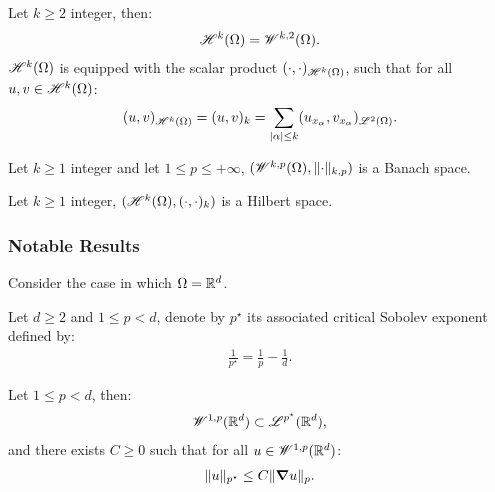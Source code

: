 \begin{definition}
    Let $k \geq 2$ integer, then:
    \begin{gather}
        \mathscr{H}^{k}(\Omega) = \mathscr{W}^{k, 2}(\Omega).
    \end{gather}
    $\mathscr{H}^{k}(\Omega)$ is equipped with the scalar product $(\cdot, \cdot)_{\mathscr{H}^{k}(\Omega)}$, such that for all $u, v \in \mathscr{H}^{k}(\Omega)$:
    \begin{gather}
        (u, v)_{\mathscr{H}^{k}(\Omega)} = (u, v)_k = \sum_{\lvert \alpha \rvert \leq k} (u_{x_{\alpha}}, v_{x_{\alpha}})_{\mathscr{L}^{2}(\Omega)}.
    \end{gather}
\end{definition}

\begin{remark}
    Let $k \geq 1$ integer and let $1 \leq p \leq +\infty$, $(\mathscr{W}^{k, p}(\Omega), \lVert \cdot \rVert_{k, p})$ is a Banach space.
\end{remark}

\begin{remark}
    Let $k \geq 1$ integer, $(\mathscr{H}^{k}(\Omega), (\cdot, \cdot)_k)$ is a Hilbert space.
\end{remark}

\subsubsection{Notable Results}

Consider the case in which $\Omega = \mathbb{R}^{d}$.

\begin{definition}
    Let $d \geq 2$ and $1 \leq p < d$, denote by $p^{\star}$ its associated critical Sobolev exponent defined by:
    \begin{gather}
        \frac{1}{p^{\star}} = \frac{1}{p} - \frac{1}{d}.
    \end{gather}
\end{definition}

\begin{theorem}
    Let $1 \leq p < d$, then:
    \begin{gather}
        \mathscr{W}^{1, p}(\mathbb{R}^{d}) \subset \mathscr{L}^{p^{\star}}(\mathbb{R}^{d}),
    \end{gather}
    and there exists $C \geq 0$ such that for all $u \in \mathscr{W}^{1, p}(\mathbb{R}^{d})$:
    \begin{gather}
        \lVert u \rVert_{p^{\star}} \leq C \lVert \bm{\nabla} u \rVert_p.
    \end{gather}
\end{theorem}

